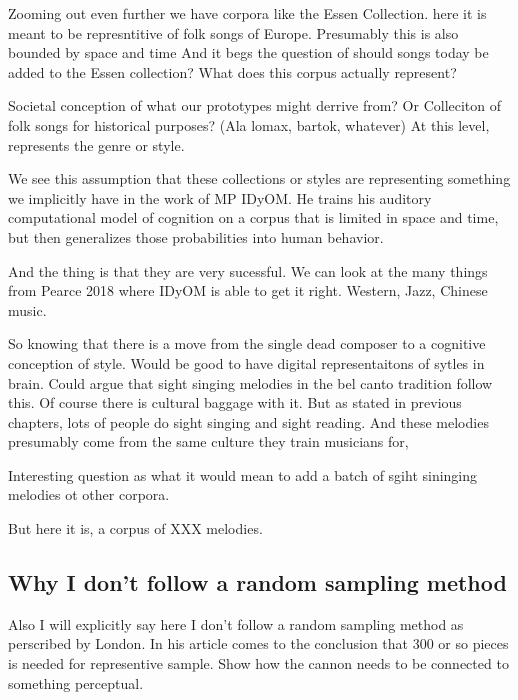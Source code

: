 \documentclass[]{book}
\begin{document}
Zooming out even further we have corpora like the Essen Collection.
here it is meant to be represntitive of folk songs of Europe.
Presumably this is also bounded by space and time
And it begs the question of should songs today be added to the Essen collection?
What does this corpus actually represent?

Societal conception of what our prototypes might derrive from?
Or Colleciton of folk songs for historical purposes? (Ala lomax, bartok, whatever)
At this level, represents the genre or style.

We see this assumption that these collections or styles are representing something we implicitly have in the work of MP IDyOM.
He trains his auditory computational model of cognition on a corpus that is limited in space and time, but then generalizes those probabilities into human behavior.

And the thing is that they are very sucessful.
We can look at the many things from Pearce 2018 where IDyOM is able to get it right.
Western, Jazz, Chinese music.

So knowing that there is a move from the single dead composer to a cognitive conception of style.
Would be good to have digital representaitons of sytles in brain.
Could argue that sight singing melodies in the bel canto tradition follow this.
Of course there is cultural baggage with it.
But as stated in previous chapters, lots of people do sight singing and sight reading.
And these melodies presumably come from the same culture they train musicians for,

Interesting question as what it would mean to add a batch of sgiht sininging melodies ot other corpora.

But here it is, a corpus of XXX melodies.

\hypertarget{why-i-dont-follow-a-random-sampling-method}{%
\subsection{Why I don't follow a random sampling method}\label{why-i-dont-follow-a-random-sampling-method}}

Also I will explicitly say here I don't follow a random sampling method as perscribed by London.
In his article comes to the conclusion that 300 or so pieces is needed for representive sample.
Show how the cannon needs to be connected to something perceptual.
\end{document}
